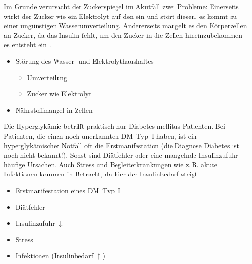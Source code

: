 {
Im Grunde verursacht der Zuckerspiegel im Akutfall zwei
Probleme: Einerseits wirkt der Zucker wie ein Elektrolyt auf
den  ein und stört diesen, es kommt
zu einer ungünstigen Wasserumverteilung. Andererseits
mangelt es den Körperzellen an Zucker, da das Insulin fehlt,
um den Zucker in die Zellen hineinzubekommen -- es entsteht ein
.
}{
\begin{itemize}
  \item Störung des Wasser- und Elektrolythaushaltes
  \begin{itemize}
    \item Umverteilung
    \item Zucker wie Elektrolyt
  \end{itemize}
  \item Nährstoffmangel in Zellen
\end{itemize}
}{}{}{}


{%
Die Hyperglykämie betrifft praktisch nur Diabetes mellitus-Patienten. Bei
Patienten, die einen noch unerkannten DM~Typ~I haben, ist
ein hyperglykämischer Notfall oft die Erstmanifestation (die
Diagnose Diabetes ist noch nicht bekannt!). Sonst sind
Diätfehler oder eine mangelnde Insulinzufuhr häufige
Ursachen. Auch Stress und Begleiterkrankungen wie z.\,B.
akute Infektionen kommen in Betracht, da hier der
Insulinbedarf steigt.
}{
\begin{itemize}
  \item Erstmanifestation eines DM~Typ~I
  \item Diätfehler
  \item Insulinzufuhr $\downarrow$
  \item Stress
  \item Infektionen (Insulinbedarf ${\uparrow}$)
\end{itemize}
}{}{}{}









